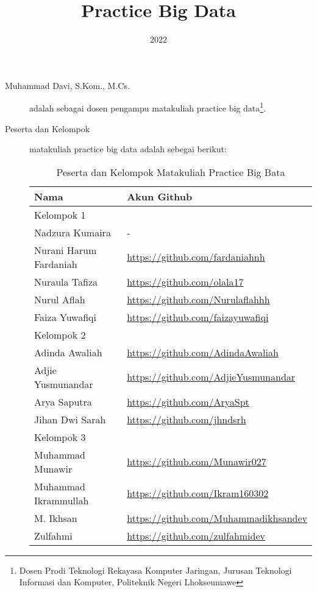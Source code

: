\documentclass[a4paper]{tufte-handout}
\title{Practice Big Data}
\date{2022}
\begin{document}
\maketitle


\begin{projects}
	\begin{description}
		\item [Muhammad Davi, S.Kom., M.Cs.] adalah sebagai dosen pengampu matakuliah practice big data\footnote{Dosen Prodi Teknologi Rekayasa Komputer Jaringan, Jurusan Teknologi Informasi dan Komputer, Politeknik Negeri Lhokseumawe}.
		\item [Peserta dan Kelompok] matakuliah practice big data adalah sebegai berikut:

\begin{table}[!ht]
\caption{Peserta dan Kelompok Matakuliah Practice Big Bata}
\label{tab:peserta}
\centering
\begin{tabular}{ll} 
\toprule
Nama &	Akun Github\\
\midrule
Kelompok 1\\
\midrule
Nadzura Kumaira			& - \\
Nurani Harum Fardaniah	& \url{https://github.com/fardaniahnh} \\
Nuraula Tafiza			& \url{https://github.com/olala17} \\
Nurul Aflah				& \url{https://github.com/Nurulaflahhh} \\
Faiza Yuwafiqi			& \url{https://github.com/faizayuwafiqi} \\
\midrule
Kelompok 2\\
\midrule
Adinda Awaliah			& \url{https://github.com/AdindaAwaliah} \\
Adjie Yusmunandar		& \url{https://github.com/AdjieYusmunandar} \\
Arya Saputra			& \url{https://github.com/AryaSpt} \\
Jihan Dwi Sarah			& \url{https://github.com/jhndsrh} \\
\midrule
Kelompok 3\\
\midrule
Muhammad Munawir		& \url{https://github.com/Munawir027} \\
Muhammad Ikrammullah	& \url{https://github.com/Ikram160302} \\
M. Ikhsan				& \url{https://github.com/Muhammadikhsandev} \\
Zulfahmi				& \url{https://github.com/zulfahmidev} \\

\end{tabular}
\end{table}
\end{description}
\end{projects}
\end{document}
